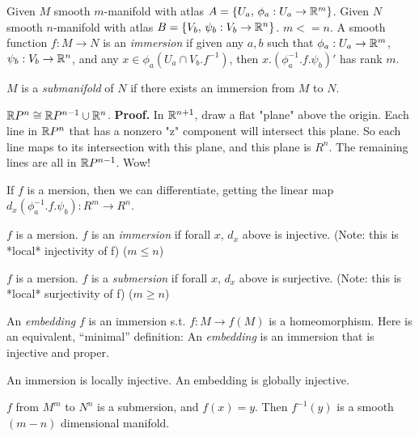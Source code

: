 \documentclass[11pt,leqno,oneside]{amsart}
\begin{document}
\begin{defn}
	Given $M$ smooth $m$-manifold with atlas $A = \{ U_a, \,\phi_a : U_a \to {\mathbb R}^m \}$.
	Given $N$ smooth $n$-manifold with atlas $B = \{ V_b, \,\psi_b : V_b \to {\mathbb R}^n \}$.
	$m <=n$.
	A smooth function $f : M \to N$  is an \emph{immersion} if given any $a, b$ such that $\phi_a: U_a \to {\mathbb R}^m$, $\psi_b: V_b \to {\mathbb R}^n$, and any $x \in \phi_a(U_a \cap V_b.f^{-1})$, then $x.(\phi_a^{-1}.f.\psi_b)'$ has rank $m$.
\end{defn}

\begin{defn}
	$M$ is a \emph{submanifold} of $N$ if there exists an immersion from $M$ to $N$.
\end{defn}

\begin{thm}
	${\mathbb R} P^n \mathrel{\cong} {\mathbb R} P^{n-1} \cup {\mathbb R}^n$.
	\textbf{Proof.}  In ${\mathbb R}^{n+1}$, draw a flat "plane" above the origin.  Each line in ${\mathbb R} P^n$ that has a nonzero "z" component will intersect this plane.  So each line maps to its intersection with this plane, and this plane is $R^n$.  The remaining lines are all in ${\mathbb R} P^{n-1}$.  Wow!
\end{thm}



If $f$ is a mersion, then we can differentiate, getting the linear map $d_x(\phi_a^{-1}.f.\psi_b): R^m \to R^n$.

\begin{thm}
	$f$ is a mersion.
	$f$ is an \emph{immersion} if forall $x$, $d_x$ above is injective.  (Note: this is *local* injectivity of f) ($m \leq n$)
\end{thm}

\begin{defn}
	$f$ is a mersion.
	$f$ is a \emph{submersion} if forall $x$, $d_x$ above is surjective.  (Note: this is *local* surjectivity of f) ($m \geq n$)
\end{defn}

\begin{defn}
	An \emph{embedding} $f$ is an immersion s.t. $f : M \to f(M)$ is a homeomorphism.  Here is an equivalent, ``minimal'' definition:  An \emph{embedding} is an immersion that is injective and proper.
\end{defn}

An immersion is locally injective.  An embedding is globally injective.

\begin{thm}
	$f$ from $M^m$ to $N^n$ is a submersion, and $f(x) = y$.  Then $f^{-1}(y)$ is a smooth $(m-n)$ dimensional manifold.
\end{thm}
\end{document}
